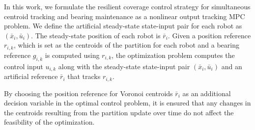 In this work, we formulate the resilient coverage control strategy for simultaneous centroid tracking and bearing maintenance as a nonlinear output tracking MPC problem. We define the artificial steady-state state-input pair for each robot as $(\bar{x}_i, \bar{u}_i)$. The steady-state position of each robot is $\bar{r}_i$. Given a position reference $r_{i,k}$, which is set as the centroids of the partition for each robot and a bearing reference $g_{i,k}$ is computed using $r_{i,k}$, the optimization problem computes the control input $u_{i,k}$ along with the steady-state state-input pair $(\bar{x}_i, \bar{u}_i)$ and an artificial reference $\bar{r}_i$ that tracks $r_{i,k}$. 
\begin{remark}
By choosing the position reference for Voronoi centroids $\bar{r}_i$ as an additional decision variable in the optimal control problem, it is ensured that any changes in the centroids resulting from the partition update over time do not affect the feasibility of the optimization.
\end{remark}

